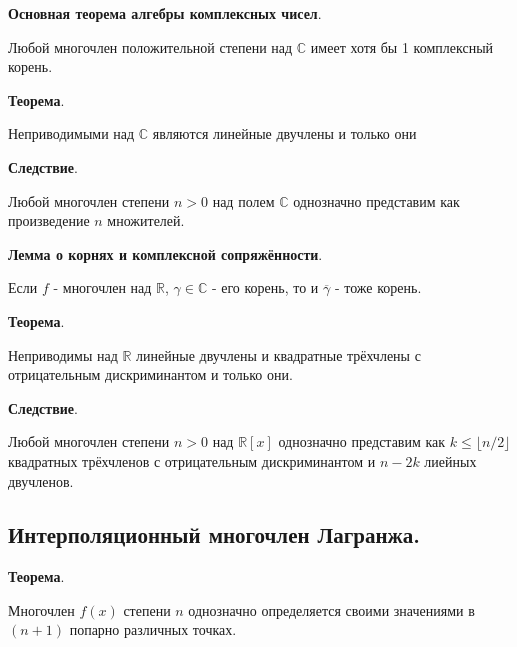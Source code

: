 \documentclass[a4paper]{article}
\begin{document}
\begin{htheorem}\textbf{Основная теорема алгебры комплексных чисел}.

Любой многочлен положительной степени над $\mathbb{C}$ имеет хотя бы 1 комплексный корень.
\end{htheorem}

\begin{htheorem}\textbf{Теорема}.

Неприводимыми над $\mathbb{C}$ являются линейные двучлены и только они
\end{htheorem}

\begin{htheorem}\textbf{Следствие}.

Любой многочлен степени $n > 0$ над полем $\mathbb{C}$ однозначно представим как произведение $n$ множителей.
\end{htheorem}

\begin{htheorem}\textbf{Лемма о корнях и комплексной сопряжённости}.

Если $f$ - многочлен над $\mathbb{R}$, $\gamma \in \mathbb{C}$ - его корень, то и $\overline{\gamma}$ - тоже корень.

\end{htheorem}


\begin{htheorem}\textbf{Теорема}.

Неприводимы над $\mathbb{R}$ линейные двучлены и квадратные трёхчлены с отрицательным дискриминантом и только они.
\end{htheorem}

\begin{htheorem}\textbf{Следствие}.

Любой многочлен степени $n>0$ над $\mathbb{R}[x]$ однозначно представим как $k \leq \lfloor n/2 \rfloor$ квадратных трёхчленов с отрицательным дискриминантом и $n-2k$ лиейных двучленов.
\end{htheorem}

\subsection*{Интерполяционный многочлен Лагранжа.}

\begin{htheorem}\textbf{Теорема}.

Многочлен $f(x)$ степени $n$ однозначно определяется своими значениями в $(n+1)$ попарно различных точках.

\end{htheorem}
\end{document}
